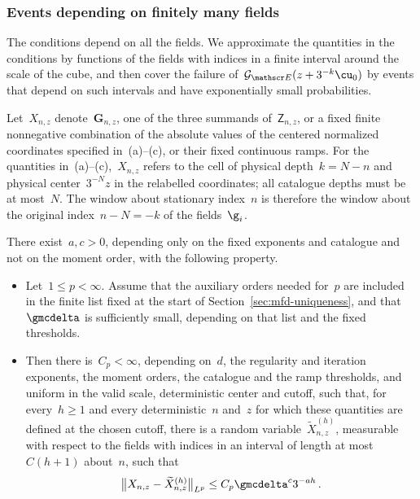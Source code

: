 \documentclass[11pt]{amsart}
\begin{document}
\subsubsection{Events depending on finitely many fields}

The conditions depend on all the fields. We approximate the quantities in the conditions by functions of the fields with indices in a finite interval around the scale of the cube, and then cover the failure of~$\mathcal G_{\mathscr E}(z+3^{-k}\cu_0)$ by events that depend on such intervals and have exponentially small probabilities.

Let~$X_{n,z}$ denote~$\mathbf G_{n,z}$, one of the three summands of~$\mathsf Z_{n,z}$, or a fixed finite nonnegative combination of the absolute values of the centered normalized coordinates specified in~(a)--(c), or their fixed continuous ramps. For the quantities in~(a)--(c),~$X_{n,z}$ refers to the cell of physical depth~$k=N-n$ and physical center~$3^{-N}z$ in the relabelled coordinates; all catalogue depths must be at most~$N$. The window about stationary index~$n$ is therefore the window about the original index~$n-N=-k$ of the fields~$\g_i$.

\begin{lemma}
\label{mfd:lem-band}
There exist~$a,c>0$, depending only on the fixed exponents and catalogue and not on the moment order, with the following property.
\begin{itemize}
\item Let~$1\leq p<\infty$. Assume that the auxiliary orders needed for~$p$ are included in the finite list fixed at the start of Section~\ref{sec:mfd-uniqueness}, and that~$\gmcdelta$ is sufficiently small, depending on that list and the fixed thresholds.
\item Then there is~$C_p<\infty$, depending on~$d$, the regularity and iteration exponents, the moment orders, the catalogue and the ramp thresholds, and uniform in the valid scale, deterministic center and cutoff, such that, for every~$h\geq1$ and every deterministic~$n$ and~$z$ for which these quantities are defined at the chosen cutoff, there is a random variable~$\widetilde X_{n,z}^{(h)}$, measurable with respect to the fields with indices in an interval of length at most~$C(h+1)$ about~$n$, such that
\begin{equation}
	\bigl\|X_{n,z}-\widetilde X_{n,z}^{(h)}\bigr\|_{L^p}\leq C_p\gmcdelta^c3^{-ah}\,.
	\label{eq:mfd-22}
\end{equation}
\end{itemize}
\end{lemma}
\end{document}
